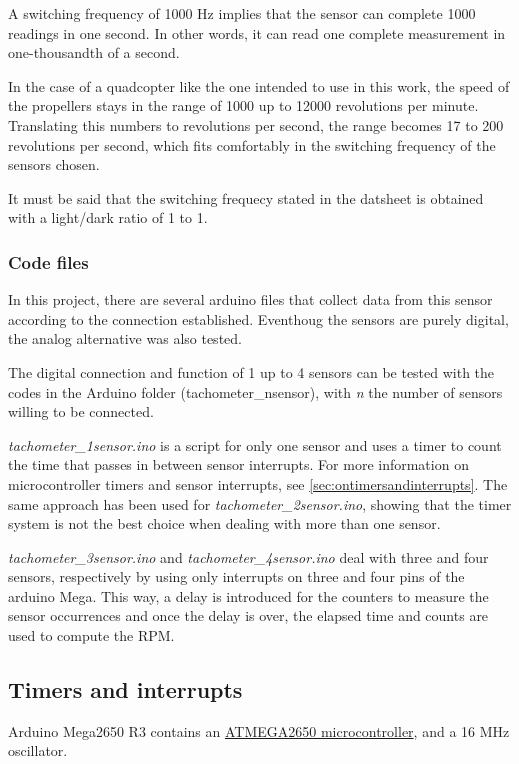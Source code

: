 \documentclass[a4paper]{article}
\begin{document}
A switching frequency of 1000 Hz implies that the sensor can complete 1000 readings in one second. In other words, it can read one complete measurement in one-thousandth of a second.

In the case of a quadcopter like the one intended to use in this work, the speed of the propellers stays in the range of 1000 up to 12000 revolutions per minute. Translating this numbers to revolutions per second, the range becomes 17 to 200 revolutions per second, which fits comfortably in the switching frequency of the sensors chosen.

It must be said that the switching frequecy stated in the datsheet is obtained with a light/dark ratio of 1 to 1.


\subsubsection{Code files}
In this project, there are several arduino files that collect data from this sensor according to the connection established. Eventhoug the sensors are purely digital, the analog alternative was also tested.



The digital connection and function of 1 up to 4 sensors can be tested with the codes in the Arduino folder (tachometer\_nsensor), with \textit{n} the number of sensors willing to be connected.

\textit{tachometer\_1sensor.ino} is a script for only one sensor and uses a timer to count the time that passes in between sensor interrupts. For more information on microcontroller timers and sensor interrupts, see \autoref{sec:ontimersandinterrupts}. The same approach has been used for \textit{tachometer\_2sensor.ino}, showing that the timer system is not the best choice when dealing with more than one sensor.

\textit{tachometer\_3sensor.ino} and \textit{tachometer\_4sensor.ino} deal with three and four sensors, respectively by using only interrupts on three and four pins of the arduino Mega. This way, a delay is introduced for the counters to measure the sensor occurrences and once the delay is over, the elapsed time and counts are used to compute the RPM.


\subsection{Timers and interrupts}
\label{sec:ontimersandinterrupts}

Arduino Mega2650 R3 contains an \hyperref{https://ww1.microchip.com/downloads/en/devicedoc/atmel-2549-8-bit-avr-microcontroller-atmega640-1280-1281-2560-2561_datasheet.pdf}{category}{name}{ATMEGA2650 microcontroller}, and a 16 MHz oscillator.
\end{document}
